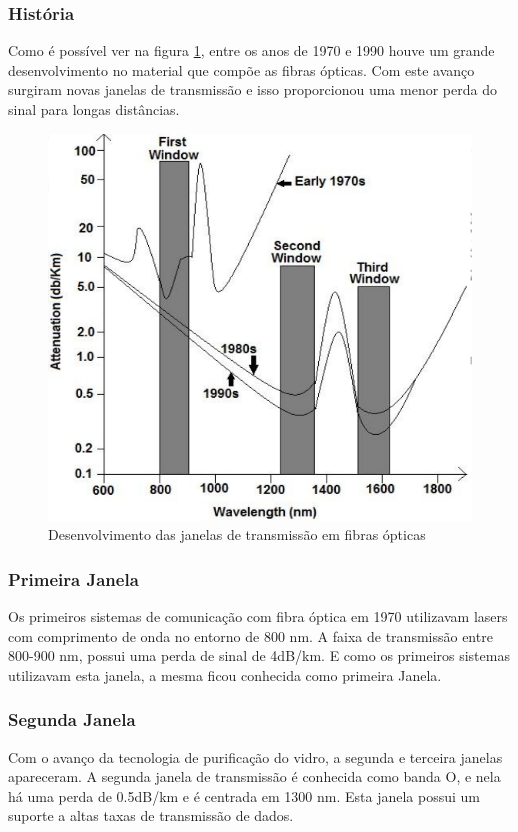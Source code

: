 \documentclass[article]{IEEEtran}
\begin{document}
\subsubsection{História}
Como é possível ver na figura \ref{fig:hist-window}, entre os anos de 1970 e 1990 houve um grande desenvolvimento no material que compõe as fibras ópticas. Com este avanço surgiram novas janelas de transmissão e isso proporcionou uma menor perda do sinal para longas distâncias.
\begin{figure}[h]
\label{fig:hist-window}
\includegraphics[width=\columnwidth]{hist-windows.png}
\caption{Desenvolvimento das janelas de transmissão em fibras ópticas}
\end{figure}


\subsubsection{Primeira Janela}
Os primeiros sistemas de comunicação com fibra óptica em 1970 utilizavam lasers com comprimento de onda no entorno de 800 nm.
A faixa de transmissão entre 800-900 nm, possui uma perda de sinal de 4dB/km. E como os primeiros sistemas utilizavam esta janela, a mesma ficou conhecida como primeira Janela.
\subsubsection{Segunda Janela}
Com o avanço da tecnologia de purificação do vidro, a segunda  e terceira janelas apareceram. A segunda janela de transmissão é conhecida como banda O, e nela há uma perda de 0.5dB/km e é centrada em 1300 nm. Esta janela possui um suporte a altas taxas de transmissão de dados.
\end{document}

